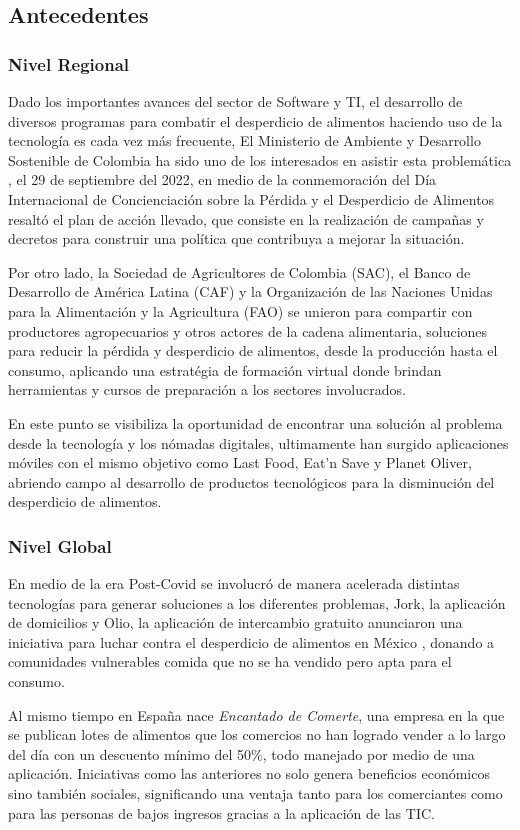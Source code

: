 \subsection{Antecedentes}

\subsubsection{Nivel Regional}

Dado los importantes avances del sector de Software y TI, el desarrollo de diversos programas para combatir el desperdicio de alimentos haciendo uso de la tecnología es cada vez más frecuente, El Ministerio de Ambiente y Desarrollo Sostenible de Colombia ha sido uno de los interesados en asistir esta problemática , el 29 de septiembre del 2022, en medio de la conmemoración del Día Internacional de Concienciación sobre la Pérdida y el Desperdicio de Alimentos resaltó el plan de acción llevado, que consiste en la realización de campañas y decretos para construir una política que contribuya a mejorar la situación.\cite{MinAmbiente}

Por otro lado, la Sociedad de Agricultores de Colombia (SAC), el Banco de Desarrollo de América Latina (CAF) y la Organización de las Naciones Unidas para la Alimentación y la Agricultura (FAO) se unieron para compartir con productores agropecuarios y otros actores de la cadena alimentaria, soluciones para reducir la pérdida y desperdicio de alimentos, desde la producción hasta el consumo, aplicando una estratégia de formación virtual donde brindan herramientas y cursos de preparación a los sectores involucrados. \cite{NUC}

En este punto se visibiliza la oportunidad de encontrar una solución al problema desde la tecnología y los nómadas digitales, ultimamente han surgido aplicaciones móviles con el mismo objetivo como Last Food, Eat'n Save y Planet Oliver, abriendo campo al desarrollo de productos tecnológicos para la disminución del desperdicio de alimentos. 

\subsubsection{Nivel Global}

En medio de la era Post-Covid se involucró de manera acelerada distintas tecnologías para generar soluciones a los diferentes problemas, Jork, la aplicación de domicilios y Olio, la aplicación de intercambio gratuito anunciaron una iniciativa para luchar contra el desperdicio de alimentos en México \cite{JOlio}, donando a comunidades vulnerables comida que no se ha vendido pero apta para el consumo.

Al mismo tiempo en España nace \textit{Encantado de Comerte}, una empresa en la que se publican lotes de alimentos que los comercios no han logrado vender a lo largo del día con un descuento mínimo del 50\%\cite{EnDComerte}, todo manejado por medio de una aplicación. Iniciativas como las anteriores no solo genera beneficios económicos sino también sociales, significando una ventaja tanto para los comerciantes como para las personas de bajos ingresos gracias a la aplicación de las TIC. 
